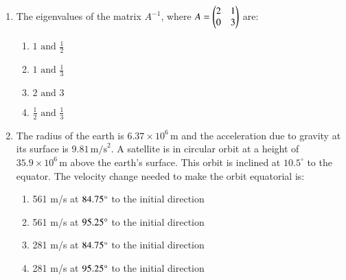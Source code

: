 \documentclass[journal]{IEEEtran}
\theoremstyle{remark}
\begin{document}
\begin{enumerate}[start=18]
\item  The eigenvalues of the matrix $A^{-1}$, where 
$ A = \begin{pmatrix}2 & 1 \\0 & 3\end{pmatrix}$
are:
\begin{multicols}{4}
\begin{enumerate}
\item $1 \text{ and } \frac{1}{2}$
\item $1 \text{ and } \frac{1}{3}$
\item $2 \text{ and } 3$
\item $\frac{1}{2} \text{ and } \frac{1}{3}$

\end{enumerate}
\end{multicols}

\item  The radius of the earth is $6.37 \times 10^6 \, \text{m}$ and the acceleration due to gravity at its surface is $9.81 \, \text{m/s}^2$. A satellite is in circular orbit at a height of $35.9 \times 10^6 \, \text{m}$ above the earth's surface. This orbit is inclined at $10.5^\circ$ to the equator. The velocity change needed to make the orbit equatorial is:
\begin{enumerate}
\item 561 m/s at $84.75\degree$ to the initial direction
\item 561 m/s at $95.25\degree$ to the initial direction
\item 281 m/s at $84.75\degree$ to the initial direction
\item 281 m/s at $95.25\degree$ to the initial direction
\end{enumerate}


\end{enumerate}
\end{document}
